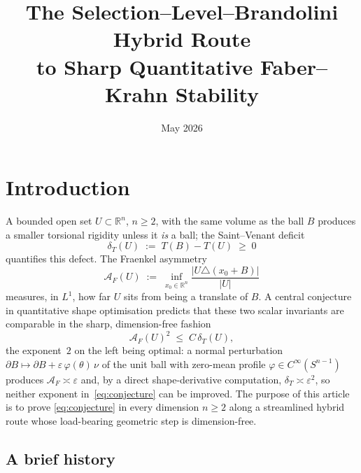\documentclass[11pt]{amsart}
\title{The Selection--Level--Brandolini Hybrid Route\\
       to Sharp Quantitative Faber--Krahn Stability}
\author{}
\date{May 2026}
\newcommand{\R}{\mathbb R}
\newcommand{\dT}{\delta_T}
\newcommand{\AF}{\mathcal A_F}
\newcommand{\eps}{\varepsilon}
\begin{document}
\maketitle
\section{Introduction}\label{sec:intro}

A bounded open set $U\subset\R^n$, $n\ge 2$, with the same volume as
the ball $B$ produces a smaller torsional rigidity unless it
\emph{is} a ball; the Saint--Venant deficit
\[
   \dT(U) \;:=\; T(B)-T(U) \;\ge\; 0
\]
quantifies this defect.  The Fraenkel asymmetry
\[
   \AF(U) \;:=\; \inf_{x_0\in\R^n}
   \frac{\bigl|U\triangle (x_0+B)\bigr|}{|U|}
\]
measures, in $L^1$, how far $U$ sits from being a translate of $B$.
A central conjecture in quantitative shape optimisation predicts that
these two scalar invariants are comparable in the sharp, dimension-free
fashion
\begin{equation}\label{eq:conjecture}
   \AF(U)^{2} \;\le\; C\,\dT(U),
\end{equation}
the exponent~$2$ on the left being optimal: a normal perturbation
$\partial B\mapsto\partial B+\eps\,\varphi(\theta)\,\nu$ of the unit
ball with zero-mean profile $\varphi\in C^\infty(S^{n-1})$ produces
$\AF\asymp\eps$ and, by a direct shape-derivative computation,
$\dT\asymp\eps^{2}$, so neither exponent in~\eqref{eq:conjecture} can
be improved.  The purpose of this article is to prove
\eqref{eq:conjecture} in every dimension $n\ge 2$ along a streamlined
hybrid route whose load-bearing geometric step is dimension-free.

\subsection*{A brief history}
\end{document}
